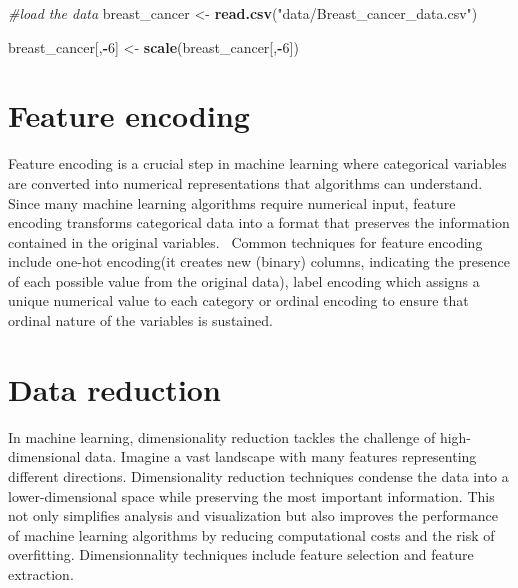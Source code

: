 \documentclass[
]{book}
\newenvironment{Shaded}{\begin{snugshade}}{\end{snugshade}}
\newcommand{\CommentTok}[1]{\textcolor[rgb]{0.56,0.35,0.01}{\textit{#1}}}
\newcommand{\DecValTok}[1]{\textcolor[rgb]{0.00,0.00,0.81}{#1}}
\newcommand{\FunctionTok}[1]{\textcolor[rgb]{0.13,0.29,0.53}{\textbf{#1}}}
\newcommand{\NormalTok}[1]{#1}
\newcommand{\OtherTok}[1]{\textcolor[rgb]{0.56,0.35,0.01}{#1}}
\newcommand{\SpecialCharTok}[1]{\textcolor[rgb]{0.81,0.36,0.00}{\textbf{#1}}}
\newcommand{\StringTok}[1]{\textcolor[rgb]{0.31,0.60,0.02}{#1}}
\begin{document}
\begin{Shaded}
\begin{Highlighting}[]
\CommentTok{\#load the data}
\NormalTok{breast\_cancer }\OtherTok{\textless{}{-}} \FunctionTok{read.csv}\NormalTok{(}\StringTok{"data/Breast\_cancer\_data.csv"}\NormalTok{)}

\NormalTok{breast\_cancer[,}\SpecialCharTok{{-}}\DecValTok{6}\NormalTok{] }\OtherTok{\textless{}{-}} \FunctionTok{scale}\NormalTok{(breast\_cancer[,}\SpecialCharTok{{-}}\DecValTok{6}\NormalTok{])}
\end{Highlighting}
\end{Shaded}

\hypertarget{feature-encoding}{%
\section{Feature encoding}\label{feature-encoding}}

Feature encoding is a crucial step in machine learning where categorical variables are converted into numerical representations that algorithms can understand. Since many machine learning algorithms require numerical input, feature encoding transforms categorical data into a format that preserves the information contained in the original variables.~
Common techniques for feature encoding include one-hot encoding(it creates new (binary) columns, indicating the presence of each possible value from the original data), label encoding which assigns a unique numerical value to each category or ordinal encoding to ensure that ordinal nature of the variables is sustained.

\begin{Shaded}
\end{Shaded}

\hypertarget{data-reduction}{%
\section{Data reduction}\label{data-reduction}}

In machine learning, dimensionality reduction tackles the challenge of high-dimensional data. Imagine a vast landscape with many features representing different directions. Dimensionality reduction techniques condense the data into a lower-dimensional space while preserving the most important information. This not only simplifies analysis and visualization but also improves the performance of machine learning algorithms by reducing computational costs and the risk of overfitting. Dimensionnality techniques include feature selection and feature extraction.
\end{document}

